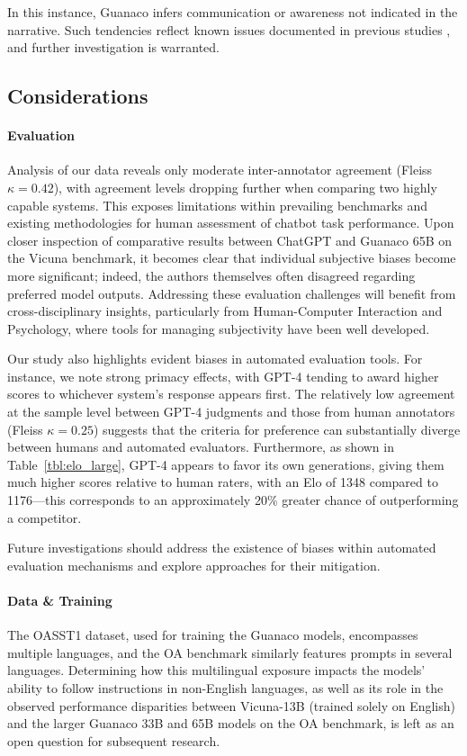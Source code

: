 In this instance, {Guanaco} infers communication or awareness not indicated in the narrative. Such tendencies reflect known issues documented in previous studies \cite{sap2022neural}, and further investigation is warranted.

\subsection{Considerations}
\label{ssec:considerations}

\paragraph{Evaluation}

Analysis of our data reveals only moderate inter-annotator agreement (Fleiss $\kappa=0.42$), with agreement levels dropping further when comparing two highly capable systems. This exposes limitations within prevailing benchmarks and existing methodologies for human assessment of chatbot task performance. Upon closer inspection of comparative results between ChatGPT and {Guanaco} 65B on the Vicuna benchmark, it becomes clear that individual subjective biases become more significant; indeed, the authors themselves often disagreed regarding preferred model outputs. Addressing these evaluation challenges will benefit from cross-disciplinary insights, particularly from Human-Computer Interaction and Psychology, where tools for managing subjectivity have been well developed.

Our study also highlights evident biases in automated evaluation tools. For instance, we note strong primacy effects, with GPT-4 tending to award higher scores to whichever system's response appears first. The relatively low agreement at the sample level between GPT-4 judgments and those from human annotators (Fleiss $\kappa=0.25$) suggests that the criteria for preference can substantially diverge between humans and automated evaluators. Furthermore, as shown in Table~\ref{tbl:elo_large}, GPT-4 appears to favor its own generations, giving them much higher scores relative to human raters, with an Elo of 1348 compared to 1176—this corresponds to an approximately 20\% greater chance of outperforming a competitor.

Future investigations should address the existence of biases within automated evaluation mechanisms and explore approaches for their mitigation.

\paragraph{Data \& Training} The OASST1 dataset, used for training the {Guanaco} models, encompasses multiple languages, and the OA benchmark similarly features prompts in several languages. Determining how this multilingual exposure impacts the models' ability to follow instructions in non-English languages, as well as its role in the observed performance disparities between Vicuna-13B (trained solely on English) and the larger {Guanaco} 33B and 65B models on the OA benchmark, is left as an open question for subsequent research.

